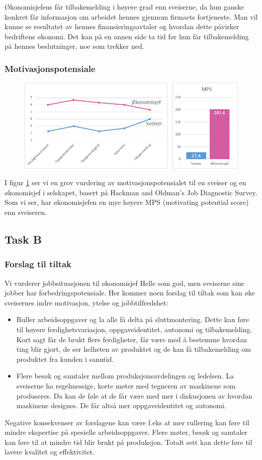 Økonomisjefens får tilbakemelding i høyere grad enn sveiserne, da hun ganske konkret får informasjon om arbeidet hennes gjennom firmaets fortjeneste. Man vil kunne se resultatet av hennes finansieringsavtaler og hvordan dette påvirker bedriftens økonomi. Det kan på en annen side ta tid før hun får tilbakemelding på hennes beslutninger, noe som trekker ned.

\subsubsection{Motivasjonspotensiale}
\begin{figure}[ht!]
    \centering
    \includegraphics[width=115mm]{mps.png}
    \label{fig:mps}
\end{figure}
I figur \ref{fig:mps} ser vi en grov vurdering av motivasjonspotensialet til en sveiser og en økonomisjef i selskapet, basert på Hackman and Oldman’s Job Diagnostic Survey. Som vi ser, har økonomisjefen en mye høyere MPS (motivating potential score) enn sveiseren.


\subsection{Task B}
\subsubsection{Forslag til tiltak}
Vi vurderer jobbsituasjonen til økonomisjef Helle som god, men sveiserne sine jobber har forbedringspotensiale. Her kommer noen forslag til tiltak som kan øke sveisernes indre motivasjon, ytelse og jobbtilfredshet:

\begin{itemize}
  \item Ruller arbeidsoppgaver og la alle få delta på sluttmontering. Dette kan føre til høyere ferdighetsvariasjon, oppgaveidentitet, autonomi og tilbakemelding. Kort sagt får de brukt flere ferdigheter, får være med å bestemme hvordan ting blir gjort, de ser helheten av produktet og de kan få tilbakemelding om produktet fra kunden i sanntid.
  \item Flere besøk og samtaler mellom produksjonsavdelingen og ledelsen. La sveiserne ha regelmessige, korte møter med tegneren av maskinene som produseres. Da kan de føle at de får være med mer i diskusjonen av hvordan maskinene designes. De får altså mer oppgaveidentitet og autonomi.
\end{itemize}

Negative konsekvenser av forslagene kan være f.eks at mer rullering kan føre til mindre ekspertise på spesielle arbeidsoppgaver. Flere møter, besøk og samtaler kan føre til at mindre tid blir brukt på produksjon. Totalt sett kan dette føre til lavere kvalitet og effektivitet.
